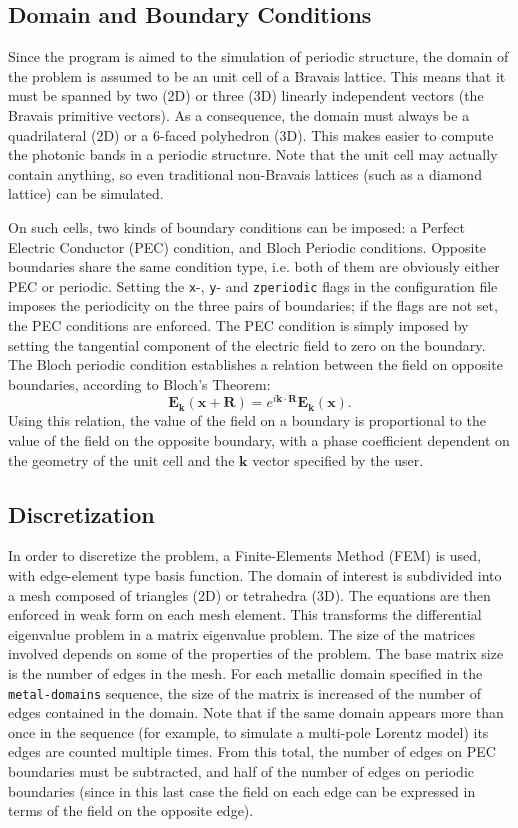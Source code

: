 \documentclass[11pt,a4paper,oneside]{article}
\begin{document}
\subsection{Domain and Boundary Conditions}
Since the program is aimed to the simulation of periodic structure, the domain of the problem is assumed to be an unit cell of a Bravais lattice. This means that it must be spanned by two (2D) or three (3D) linearly independent vectors (the Bravais primitive vectors). As a consequence, the domain must always be a quadrilateral (2D) or a 6-faced polyhedron (3D). This makes easier to compute the photonic bands in a periodic structure. Note that the unit cell may actually contain anything, so even traditional non-Bravais lattices (such as a diamond lattice) can be simulated.

On such cells, two kinds of boundary conditions can be imposed: a Perfect Electric Conductor (PEC) condition, and Bloch Periodic conditions. Opposite boundaries share the same condition type, i.e. both of them are obviously either PEC or periodic. Setting the {\tt x}-, {\tt y}- and {\tt zperiodic} flags in the configuration file imposes the periodicity on the three pairs of boundaries; if the flags are not set, the PEC conditions are enforced.
The PEC condition is simply imposed by setting the tangential component of the electric field to zero on the boundary. The Bloch periodic condition establishes a relation between the field on opposite boundaries, according to Bloch's Theorem:
\begin{equation}
\boldsymbol{E}_{\boldsymbol{k}}(\boldsymbol{x} + \boldsymbol{R})=e^{i\boldsymbol{k\cdot R}}\boldsymbol{E}_{\boldsymbol{k}}(\boldsymbol{x}).
\end{equation}
Using this relation, the value of the field on a boundary is proportional to the value of the field on the opposite boundary, with a phase coefficient dependent on the geometry of the unit cell and the $\boldsymbol{k}$ vector specified by the user.

\subsection{Discretization}
In order to discretize the problem, a Finite-Elements Method (FEM) is used, with edge-element type basis function. The domain of interest is subdivided into a mesh composed of triangles (2D) or tetrahedra (3D). The equations are then enforced in weak form on each mesh element. This transforms the differential eigenvalue problem in a matrix eigenvalue problem. The size of the matrices involved depends on some of the properties of the problem. The base matrix size is the number of edges in the mesh. For each metallic domain specified in the {\tt metal-domains} sequence, the size of the matrix is increased of the number of edges contained in the domain. Note that if the same domain appears more than once in the sequence (for example, to simulate a multi-pole Lorentz model) its edges are counted multiple times. From this total, the number of edges on PEC boundaries must be subtracted, and half of the number of edges on periodic boundaries (since in this last case the field on each edge can be expressed in terms of the field on the opposite edge).
\end{document}
